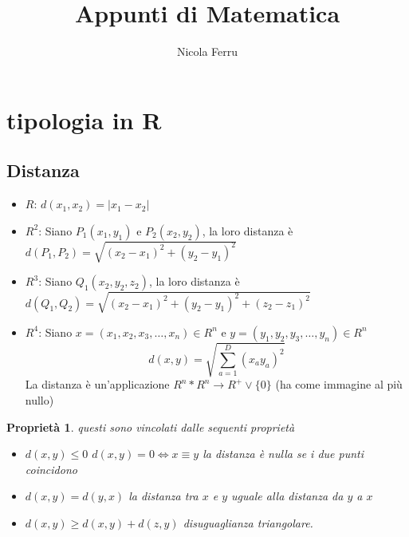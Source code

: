 \documentclass{book}
\title{Appunti di Matematica}
\author{Nicola Ferru}
\date{}
\newtheorem{pro}{Proprietà}
\newcommand{\abs}[1]{\lvert#1\rvert}
\begin{document}


\tableofcontents
\listoftables
\listoffigures




\section{tipologia in R}
\subsection{Distanza}
\begin{itemize}
\item {\color{red} $R$}: $d(x_1,x_2)=\abs{x_1-x_2}$
\item {\color{red} $R^2$}: Siano $P_1(x_1,y_1)$ e $P_2(x_2,y_2)$, la loro distanza è $d(P_1,P_2)=\sqrt{(x_2-x_1)^2+(y_2-y_1)^2}$
\item {\color{red} $R^3$}: Siano $Q_1(x_2,y_2,z_2)$, la loro distanza è $d(Q_1,Q_2)=\sqrt{(x_2-x_1)^2+(y_2-y_1)^2+(z_2-z_1)^2}$
\item {\color{red} $R^4$}: Siano $x=(x_1,x_2,x_3,\dots,x_n)\in R^n$ e $y=(y_1,y_2,y_3,\dots,y_n)\in R^n$
  \begin{equation*}
    d(x,y)=\sqrt{\sum^D_{a=1}(x_ay_a)^2}
  \end{equation*}
  La distanza è un'applicazione $R^n*R^n\to R^+\vee \{0\}$ (ha come immagine al più nullo)
\end{itemize}
\begin{pro}
  questi sono vincolati dalle sequenti proprietà
  \begin{itemize}
  \item $d(x,y)\leq 0$ $d(x,y)=0 \Leftrightarrow x\equiv y$ la distanza è nulla se i due punti coincidono
  \item $d(x,y) = d(y,x)$ la distanza tra $x$ e $y$ uguale alla distanza da $y$ a $x$
  \item $d(x,y)\geq d(x,y)+d(z,y)$ disuguaglianza triangolare.
  \end{itemize}
\end{pro}
\end{document}
